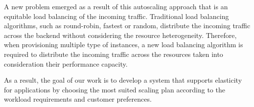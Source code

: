 A new problem emerged as a result of this autoscaling approach that is an equitable load balancing of the incoming traffic. Traditional load balancing algorithms, such as round-robin, fastest or random, distribute the incoming traffic across the backend without considering the resource heterogeneity. Therefore, when provisioning multiple type of instances, a new load balancing algorithm is required to distribute the incoming traffic across the resources taken into consideration their performance capacity. 

As a result, the goal of our work is to develop a system that supports elasticity for applications by choosing the most suited scaling plan according to the workload requirements and customer preferences.















